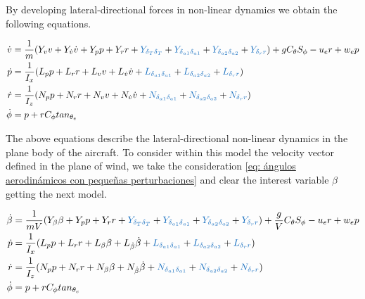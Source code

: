 By developing lateral-directional forces in non-linear dynamics we obtain the following equations. 

\begin{align}
    \dot v & = \frac{1}{m}(Y_{v} v + Y_{\dot v}\dot v + Y_{p}p + Y_{r} r + \textcolor{RoyalBlue}{Y_{\delta_{T} \delta_{T}}} + \textcolor{RoyalBlue}{Y_{\delta_{a1} \delta_{a1}}} + \textcolor{RoyalBlue}{Y_{\delta_{a2} \delta_{a2}}}  + \textcolor{RoyalBlue}{Y_{\delta_{r}r}}) + gC_{\theta}S_{\phi} - u_{e}r + w_{e}p  \\
    \dot p & = \frac{1}{I_x}(L_{p}p + L_{r}r + L_{v}v + L_{\dot v}\dot v + \textcolor{RoyalBlue}{L_{\delta_{a1} \delta_{a1}}} + \textcolor{RoyalBlue}{L_{\delta_{a2} \delta_{a2}}}  + \textcolor{RoyalBlue}{L_{\delta_{r}r}}) \\
    \dot r & = \frac{1}{I_z}(N_{p}p + N_{r}r + N_{v}v + N_{\dot v}\dot v + \textcolor{RoyalBlue}{N_{\delta_{a1} \delta_{a1}}} + \textcolor{RoyalBlue}{N_{\delta_{a2} \delta_{a2}}}  + \textcolor{RoyalBlue}{N_{\delta_{r}r}})\\
    \dot \phi &= p + r C_{\phi} tan_{\theta_{e}}
\end{align}

The above equations describe the lateral-directional non-linear dynamics in the plane body of the aircraft. To consider within this model the velocity vector defined in the plane of wind, we take the consideration  \ref{eq: ángulos aerodinámicos con pequeñas perturbaciones} and clear the interest variable $\beta$ getting the next model. 

\begin{align}
    \dot \beta & = \frac{1}{mV}(Y_{\beta} \beta + Y_{p}p + Y_{r} r +   \textcolor{RoyalBlue}{Y_{\delta_{T} \delta_{T}}} + \textcolor{RoyalBlue}{Y_{\delta_{a1} \delta_{a1}}} + \textcolor{RoyalBlue}{Y_{\delta_{a2} \delta_{a2}}}  + \textcolor{RoyalBlue}{Y_{\delta_{r}r}}) + \frac{g}{V}C_{\theta}S_{\phi} - u_{e}r + w_{e}p  \\
    \dot p & = \frac{1}{I_x}(L_{p}p + L_{r}r + L_{\beta}\beta + L_{\dot \beta}\dot \beta + \textcolor{RoyalBlue}{L_{\delta_{a1} \delta_{a1}}} + \textcolor{RoyalBlue}{L_{\delta_{a2} \delta_{a2}}}  + \textcolor{RoyalBlue}{L_{\delta_{r}r}}) \\
    \dot r & = \frac{1}{I_z}(N_{p}p + N_{r}r + N_{\beta}\beta + N_{\dot \beta}\dot \beta + \textcolor{RoyalBlue}{N_{\delta_{a1} \delta_{a1}}} + \textcolor{RoyalBlue}{N_{\delta_{a2} \delta_{a2}}}  + \textcolor{RoyalBlue}{N_{\delta_{r}r}})\\
    \dot \phi &= p + r C_{\phi} tan_{\theta_{e}}
\end{align}


